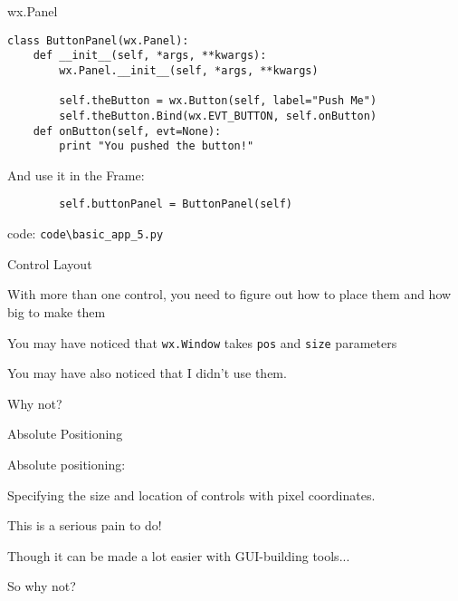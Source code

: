 \documentclass{beamer}
\begin{document}
\begin{frame}[fragile]{wx.Panel}

\begin{verbatim}
class ButtonPanel(wx.Panel):
    def __init__(self, *args, **kwargs):
        wx.Panel.__init__(self, *args, **kwargs)

        self.theButton = wx.Button(self, label="Push Me")
        self.theButton.Bind(wx.EVT_BUTTON, self.onButton)
    def onButton(self, evt=None):
        print "You pushed the button!"
\end{verbatim}
And use it in the Frame:
\begin{verbatim}
        self.buttonPanel = ButtonPanel(self)
\end{verbatim}

\vfill
code: \verb`code\basic_app_5.py`
\end{frame}

\begin{frame}[fragile]{Control Layout}

{\Large With more than one control, you need to figure out how to place them 
and how big to make them}

\vfill
{\Large You may have noticed that \verb`wx.Window` takes \verb`pos` and \verb`size` parameters}

\vfill
{\Large You may have also noticed that I didn't use them.}

\vfill
{\Large Why not?}

\end{frame}

\begin{frame}[fragile]{Absolute Positioning}

{\LARGE Absolute positioning:}

\vfill
{\Large Specifying the size and location of controls with pixel coordinates.}

\vfill
{\Large This is a serious pain to do!}

\vfill
{\Large Though it can be made a lot easier with GUI-building tools...}

\vfill
{\Large So why not?}

\end{frame}
\end{document}
